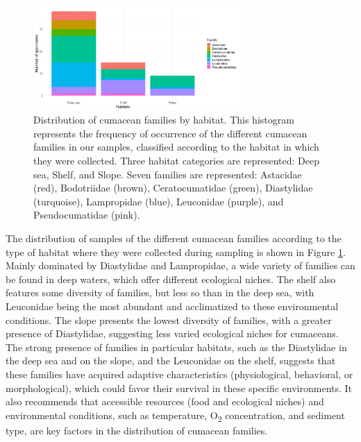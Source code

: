 \begin{figure}[]
    \centering
    \includegraphics[width=0.7\textwidth]{figure4.png}
    \caption{Distribution of cumacean families by habitat. This histogram represents the frequency of occurrence of the different cumacean families in our samples, classified according to the habitat in which they were collected. Three habitat categories are represented: Deep sea, Shelf, and Slope. Seven families are represented: Astacidae (red), Bodotriidae (brown), Ceratocumatidae (green), Diastylidae (turquoise), Lampropidae (blue), Leuconidae (purple), and Pseudocumatidae (pink). \label{fig:fig5}}
\end{figure}

The distribution of samples of the different cumacean families according to the type of habitat where they were collected during sampling is shown in Figure \ref{fig:fig5}. Mainly dominated by Diastylidae and Lampropidae, a wide variety of families can be found in deep waters, which offer different ecological niches. The shelf also features some diversity of families, but less so than in the deep sea, with Leuconidae being the most abundant and acclimatized to these environmental conditions. The slope presents the lowest diversity of families, with a greater presence of Diastylidae, suggesting less varied ecological niches for cumaceans. The strong presence of families in particular habitats, such as the Diastylidae in the deep sea and on the slope, and the Leuconidae on the shelf, suggests that these families have acquired adaptive characteristics (physiological, behavioral, or morphological), which could favor their survival in these specific environments. It also recommends that accessible resources (food and ecological niches) and environmental conditions, such as temperature, O\textsubscript{2} concentration, and sediment type, are key factors in the distribution of cumacean families.

